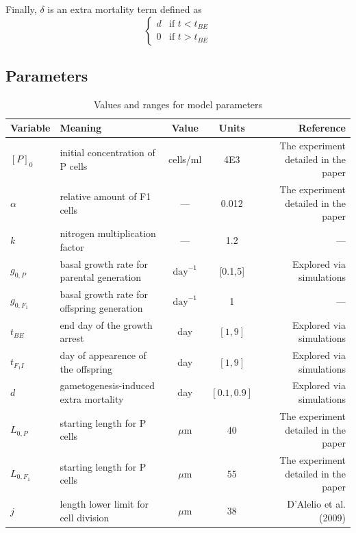 \documentclass[a4paper,oneside]{book}
\begin{document}
    Finally, $\delta$ is an extra mortality term defined as
    \[
      \begin{cases}
        d & \mbox{if } t < t_{BE} \\
        0 & \mbox{if } t > t_{BE}
      \end{cases}
    \]
    \subsection*{Parameters}
      \begin{table}[h]
         \begin{tabular}{@{}llccr@{}}
          \toprule
            \textbf{Variable}&\textbf{Meaning} & \textbf{Value} & \textbf{Units} & \textbf{Reference}\\
          \midrule
            ${[P]}_{0}$     & initial concentration of P cells           & cells/ml          & 4E3           & The experiment detailed in the paper\\
            $\alpha$        & relative amount of F1 cells                & ---               & 0.012         & The experiment detailed in the paper\\
            $k$             & nitrogen multiplication factor             & ---               & 1.2           & ---\\
            $g_{0, P}$      & basal growth rate for parental generation  & $\text{day}^{-1}$ & {[0.1,5]}     & Explored via simulations\\
            $g_{0, F_{1}}$  & basal growth rate for offspring generation & $\text{day}^{-1}$ & 1             & ---\\
            $t_{BE}$        & end day of the growth arrest               & day               & ${[1,9]}$     & Explored via simulations\\
            $t_{F_{1}I}$    & day of appearence of the offspring         & day               & ${[1,9]}$     & Explored via simulations\\
            $d$             & gametogenesis-induced extra mortality      & day               & ${[0.1,0.9]}$ & Explored via simulations\\
            $L_{0,P}$       & starting length for P cells                &$\mu$m             & 40            & The experiment detailed in the paper\\
            $L_{0,{F_{1}}}$ & starting length for P cells                &$\mu$m             & 55            & The experiment detailed in the paper\\
            $j$             & length lower limit for cell division       &$\mu$m             & 38            & D'Alelio et al. (2009)\\
          \bottomrule
        \end{tabular}
        \caption{Values and ranges for model parameters}\label{tbl1}
      \end{table}
%
\pagebreak
%
\end{document}
